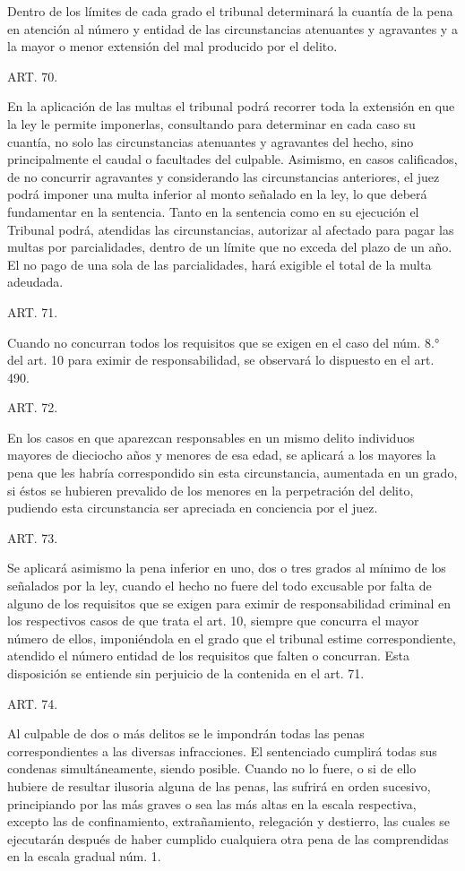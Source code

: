     Dentro de los límites de cada grado el tribunal determinará la cuantía de la pena en atención al número y entidad de las circunstancias atenuantes y agravantes y a la mayor o menor extensión del mal producido por el delito.


    ART. 70.

    En la aplicación de las multas el tribunal podrá recorrer toda la extensión en que la ley le permite imponerlas, consultando para determinar en cada caso su cuantía, no solo las circunstancias atenuantes y agravantes del hecho, sino principalmente el caudal o facultades del culpable. Asimismo, en casos calificados, de no concurrir agravantes y considerando las circunstancias anteriores, el juez podrá imponer una multa inferior al monto señalado en la ley, lo que deberá fundamentar en la sentencia.
    Tanto en la sentencia como en su ejecución el Tribunal podrá, atendidas las circunstancias, autorizar al afectado para pagar las multas por parcialidades, dentro de un límite que no exceda del plazo de un año. El no pago de una sola de las parcialidades, hará exigible el total de la multa adeudada.




    ART. 71.

    Cuando no concurran todos los requisitos que se exigen en el caso del núm. 8.° del art. 10 para eximir de responsabilidad, se observará lo dispuesto en el art. 490.



    ART. 72.

    En los casos en que aparezcan responsables en un mismo delito individuos mayores de dieciocho años y menores de esa edad, se aplicará a los mayores la pena que les habría correspondido sin esta circunstancia, aumentada en un grado, si éstos se hubieren prevalido de los menores en la perpetración del delito, pudiendo esta circunstancia ser apreciada en conciencia por el juez.




    ART. 73.

    Se aplicará asimismo la pena inferior en uno, dos o tres grados al mínimo de los señalados por la ley, cuando el hecho no fuere del todo excusable por falta de alguno de los requisitos que se exigen para eximir de responsabilidad criminal en los respectivos casos de que trata el art. 10, siempre que concurra el mayor número de ellos, imponiéndola en el grado que el tribunal estime correspondiente, atendido el número entidad de los requisitos que falten o concurran.
    Esta disposición se entiende sin perjuicio de la contenida en el art. 71.


    ART. 74.

    Al culpable de dos o más delitos se le impondrán todas las penas correspondientes a las diversas infracciones.
    El sentenciado cumplirá todas sus condenas simultáneamente, siendo posible. Cuando no lo fuere, o si de ello hubiere de resultar ilusoria alguna de las penas, las sufrirá en orden sucesivo, principiando por las más graves o sea las más altas en la escala respectiva, excepto las de confinamiento, extrañamiento, relegación y destierro, las cuales se ejecutarán después de haber cumplido cualquiera otra pena de las comprendidas en la escala gradual núm. 1.


